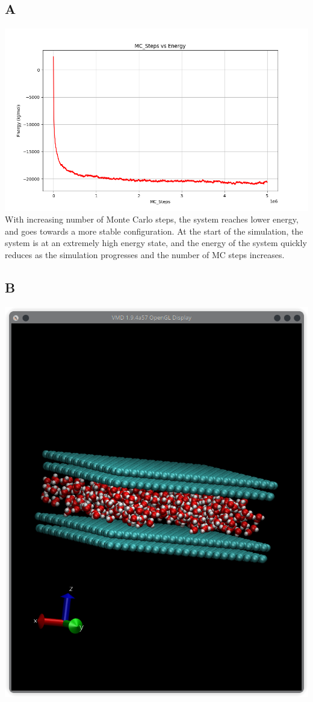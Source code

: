 \documentclass[11pt]{article}
\begin{document}
\subsection{A}
\includegraphics[scale=0.5]{Q5a.png}\\
With increasing number of Monte Carlo steps, the system reaches lower energy, and goes towards a more stable configuration. At the start of the simulation, the system is at an extremely high energy state, and the energy of the system quickly reduces as the simulation progresses and the number of MC steps increases. \\
\subsection{B}
\includegraphics[scale=0.5]{Q5b.png}
\end{document}
